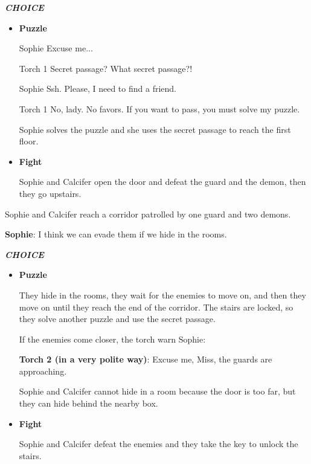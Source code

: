 \textit{\textbf{CHOICE}}
\begin{itemize}
  \item \textbf{Puzzle}
  
\begin{screenplay}

\begin{dialogue}{Sophie}
Excuse me...
\end{dialogue}

\begin{dialogue}{Torch 1}
Secret passage? What secret passage?!
\end{dialogue}

\begin{dialogue}{Sophie}
Ssh. Please, I need to find a friend.
\end{dialogue}

\begin{dialogue}[determined]{Torch 1}
No, lady. No favors. If you want to pass, you must solve my puzzle.
\end{dialogue}

\end{screenplay}
\vspace{1em}

    Sophie solves the puzzle and she uses the secret passage to reach the first floor.

  \item \textbf{Fight}
  
  Sophie and Calcifer open the door and defeat the guard and the demon, then they go upstairs.
\end{itemize}


Sophie and Calcifer reach a corridor patrolled by one guard and two demons.

\textbf{Sophie}: I think we can evade them if we hide in the rooms.

\textit{\textbf{CHOICE}}
\begin{itemize}
  \item \textbf{Puzzle}
  
  They hide in the rooms, they wait for the enemies to move on, and then they move on until they reach the end of the corridor. The stairs are locked, so they solve another puzzle and use the secret passage.
  
  If the enemies come closer, the torch warn Sophie:
  
  \textbf{Torch 2 (in a very polite way)}: Excuse me, Miss, the guards are approaching.
  
  Sophie and Calcifer cannot hide in a room because the door is too far, but they can hide behind the nearby box.

  \item \textbf{Fight}
  
  Sophie and Calcifer defeat the enemies and they take the key to unlock the stairs.
\end{itemize}

